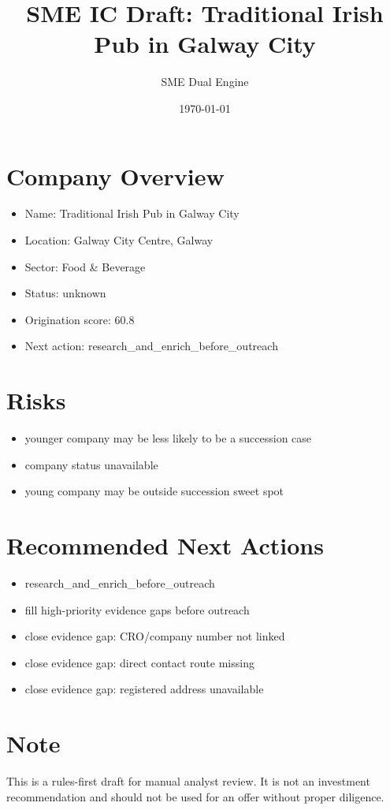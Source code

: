 \documentclass[11pt,a4paper]{article}
\title{SME IC Draft: Traditional Irish Pub in Galway City}
\author{SME Dual Engine}
\date{\today}
\begin{document}
\maketitle
\section*{Company Overview}
\begin{itemize}[leftmargin=1.4em]
\item Name: Traditional Irish Pub in Galway City
\item Location: Galway City Centre, Galway
\item Sector: Food \& Beverage
\item Status: unknown
\item Origination score: 60.8
\item Next action: research\_and\_enrich\_before\_outreach
\end{itemize}
\section*{Risks}
\begin{itemize}[leftmargin=1.4em]
\item younger company may be less likely to be a succession case
\item company status unavailable
\item young company may be outside succession sweet spot
\end{itemize}
\section*{Recommended Next Actions}
\begin{itemize}[leftmargin=1.4em]
\item research\_and\_enrich\_before\_outreach
\item fill high-priority evidence gaps before outreach
\item close evidence gap: CRO/company number not linked
\item close evidence gap: direct contact route missing
\item close evidence gap: registered address unavailable
\end{itemize}
\section*{Note}
This is a rules-first draft for manual analyst review. It is not an investment
recommendation and should not be used for an offer without proper diligence.
\end{document}
